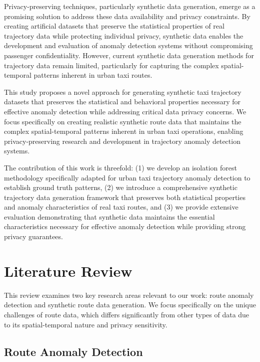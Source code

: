 \documentclass[runningheads]{llncs}
\begin{document}
Privacy-preserving techniques, particularly synthetic data generation, emerge as a promising solution to address these data availability and privacy constraints. By creating artificial datasets that preserve the statistical properties of real trajectory data while protecting individual privacy, synthetic data enables the development and evaluation of anomaly detection systems without compromising passenger confidentiality. However, current synthetic data generation methods for trajectory data remain limited, particularly for capturing the complex spatial-temporal patterns inherent in urban taxi routes.

This study proposes a novel approach for generating synthetic taxi trajectory datasets that preserves the statistical and behavioral properties necessary for effective anomaly detection while addressing critical data privacy concerns. We focus specifically on creating realistic synthetic route data that maintains the complex spatial-temporal patterns inherent in urban taxi operations, enabling privacy-preserving research and development in trajectory anomaly detection systems.

The contribution of this work is threefold: (1) we develop an isolation forest methodology specifically adapted for urban taxi trajectory anomaly detection to establish ground truth patterns, (2) we introduce a comprehensive synthetic trajectory data generation framework that preserves both statistical properties and anomaly characteristics of real taxi routes, and (3) we provide extensive evaluation demonstrating that synthetic data maintains the essential characteristics necessary for effective anomaly detection while providing strong privacy guarantees.

\section{Literature Review}
\label{sec:literature-review}

This review examines two key research areas relevant to our work: route anomaly detection and synthetic route data generation. We focus specifically on the unique challenges of route data, which differs significantly from other types of data due to its spatial-temporal nature and privacy sensitivity.

\subsection{Route Anomaly Detection}
\label{sec:detection-review}
\end{document}

